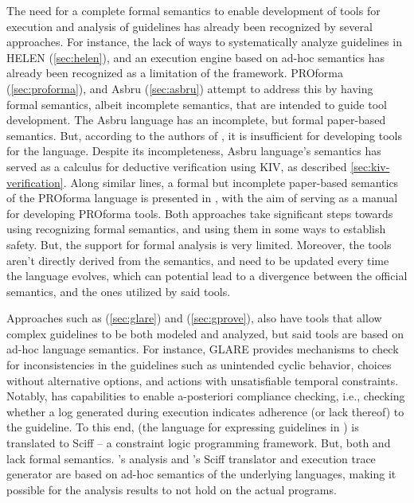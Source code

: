 The need for a complete formal semantics to enable development of tools for
execution and analysis of guidelines has already been recognized by several
approaches. For instance, the lack of ways to systematically analyze guidelines
in HELEN (\autoref{sec:helen}), and an execution engine based on ad-hoc
semantics has already been recognized as a limitation of the framework.
 PROforma (\autoref{sec:proforma}), and
Asbru (\autoref{sec:asbru}) attempt to address this by having formal
semantics, albeit incomplete semantics, that are intended to guide tool
development. The Asbru language has an incomplete, but formal
\SOS{} paper-based semantics. But, according to the authors of
\cite{SuttonAMIA03}, it is insufficient for developing tools for the language.
Despite its incompleteness, Asbru language's semantics has served as a calculus for deductive verification
using KIV, as described \autoref{sec:kiv-verification}.
Along similar lines, a formal but incomplete paper-based semantics
of the PROforma language is
presented in \cite{SuttonAMIA03}, with the aim of serving as a manual for
developing PROforma tools. Both approaches take significant steps towards using
recognizing formal semantics, and using them in some ways
to establish \CDSS{} safety. But, the support for formal analysis is very
limited. Moreover, the tools aren't directly derived
from the semantics, and need to be updated every time the language evolves,
which can potential lead to a divergence between the official semantics, and
the ones utilized by said tools.

Approaches such as \GLARE{} (\autoref{sec:glare}) and \GPROVE (\autoref{sec:gprove}), also have tools that allow complex guidelines to
be both modeled and analyzed, but said tools are based on ad-hoc language
semantics. For instance, GLARE{} provides mechanisms to check
for inconsistencies in the guidelines such as unintended cyclic
behavior, choices without alternative options, and actions
with unsatisfiable temporal constraints. Notably, \GPROVE{}
has capabilities to enable a-posteriori compliance checking, i.e., checking whether a log
generated during execution indicates adherence (or lack thereof) to the guideline.
To this end, \GOSPEL{} (the language for expressing guidelines in \GPROVE{})
is translated to Sciff -- a constraint logic programming framework.
But, both \GLARE{} and \GPROVE{} lack formal semantics. \GLARE{}'s analysis
and \GPROVE{}'s Sciff translator and execution trace generator are based on
ad-hoc semantics of the underlying languages, making it possible for the
analysis results to not hold on the actual programs.

